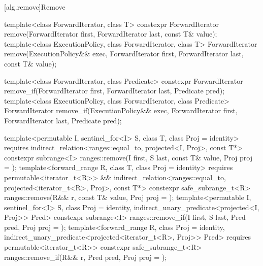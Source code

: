 [alg.remove]{Remove}

%
%
\begin{itemdecl}
template<class ForwardIterator, class T>
  constexpr ForwardIterator remove(ForwardIterator first, ForwardIterator last,
                                   const T& value);
template<class ExecutionPolicy, class ForwardIterator, class T>
  ForwardIterator remove(ExecutionPolicy&& exec,
                         ForwardIterator first, ForwardIterator last,
                         const T& value);

template<class ForwardIterator, class Predicate>
  constexpr ForwardIterator remove_if(ForwardIterator first, ForwardIterator last,
                                      Predicate pred);
template<class ExecutionPolicy, class ForwardIterator, class Predicate>
  ForwardIterator remove_if(ExecutionPolicy&& exec,
                            ForwardIterator first, ForwardIterator last,
                            Predicate pred);

template<permutable I, sentinel_for<I> S, class T, class Proj = identity>
  requires indirect_relation<ranges::equal_to, projected<I, Proj>, const T*>
  constexpr subrange<I> ranges::remove(I first, S last, const T& value, Proj proj = {});
template<forward_range R, class T, class Proj = identity>
  requires permutable<iterator_t<R>> &&
           indirect_relation<ranges::equal_to, projected<iterator_t<R>, Proj>, const T*>
  constexpr safe_subrange_t<R>
    ranges::remove(R&& r, const T& value, Proj proj = {});
template<permutable I, sentinel_for<I> S, class Proj = identity,
         indirect_unary_predicate<projected<I, Proj>> Pred>
  constexpr subrange<I> ranges::remove_if(I first, S last, Pred pred, Proj proj = {});
template<forward_range R, class Proj = identity,
         indirect_unary_predicate<projected<iterator_t<R>, Proj>> Pred>
  requires permutable<iterator_t<R>>
  constexpr safe_subrange_t<R>
    ranges::remove_if(R&& r, Pred pred, Proj proj = {});
\end{itemdecl}

